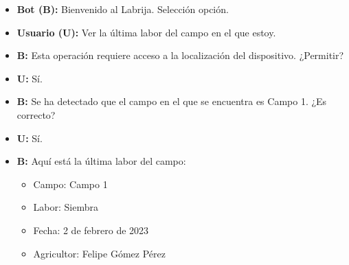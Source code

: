 \begin{solucion}
    \begin{itemize}
        \item \textbf{Bot (B):} Bienvenido al Labrija.
        Selección opción.
        \item \textbf{Usuario (U):} Ver la última labor del campo en el que estoy.
        \item \textbf{B:} Esta operación requiere acceso a la localización del dispositivo.
        ¿Permitir?
        \item \textbf{U:} Sí.
        \item \textbf{B:} Se ha detectado que el campo en el que se encuentra es Campo 1.
        ¿Es correcto?
        \item \textbf{U:} Sí.
        \item \textbf{B:} Aquí está la última labor del campo:
        \begin{itemize}
            \item Campo: Campo 1
            \item Labor: Siembra
            \item Fecha: 2 de febrero de 2023
            \item Agricultor: Felipe Gómez Pérez
        \end{itemize}
    \end{itemize}
\end{solucion}
